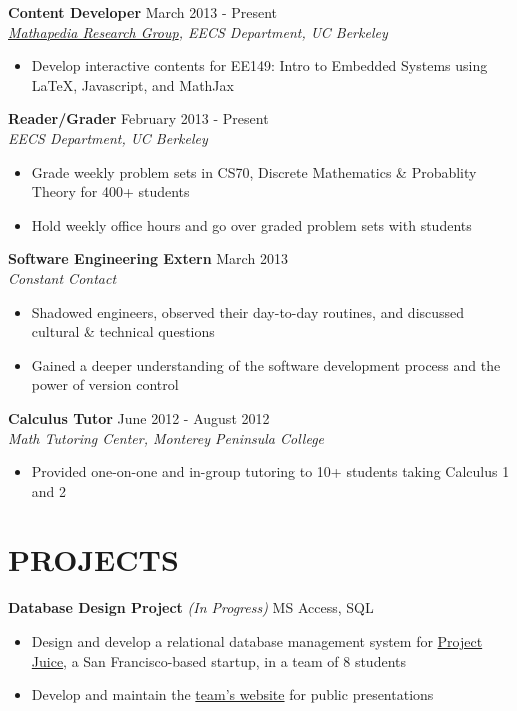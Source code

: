 \documentclass[margin]{res}
\begin{document}
\begin{resume}
\textbf{Content Developer} \hfill March 2013 - Present \\
\textit{\href{https://mathapedia.com/}{Mathapedia Research Group}, EECS Department, UC Berkeley} \smallskip
\begin{itemize}[leftmargin=10pt]
\item Develop interactive contents for EE149: Intro to Embedded Systems using \LaTeX{}, Javascript, and MathJax
\end{itemize}

\textbf{Reader/Grader} \hfill February 2013 - Present\\
\textit{EECS Department, UC Berkeley} \smallskip
\begin{itemize}[leftmargin=10pt]
\item Grade weekly problem sets in CS70, Discrete Mathematics \& Probablity Theory for 400+ students
\item Hold weekly office hours and go over graded problem sets with students
\end{itemize}

\textbf{Software Engineering Extern} \hfill March 2013 \\
\textit{Constant Contact} \smallskip
\begin{itemize}[leftmargin=10pt]
\item Shadowed engineers, observed their day-to-day routines, and discussed cultural \& technical questions
\item Gained a deeper understanding of the software development process and the power of version control  
\end{itemize}

\textbf{Calculus Tutor} \hfill June 2012 - August 2012 \\
\textit{Math Tutoring Center, Monterey Peninsula College} \smallskip
\begin{itemize}[leftmargin=10pt]
\item Provided one-on-one and in-group tutoring to 10+ students taking Calculus 1 and 2
\end{itemize}

\section{PROJECTS} 
\textbf{Database Design Project} \textit{(In Progress)} \hfill MS Access, SQL
\begin{itemize}[leftmargin=10pt]
\itemsep -2pt %
\item Design and develop a relational database management system for \href{http://www.projectjuice.com/}{Project Juice}, a San Francisco-based startup, in a team of 8 students
\item Develop and maintain the \href{http://www.ocf.berkeley.edu/~kqdtran/ieor115/proposal}{team's website} for public presentations
\end{itemize}


\end{resume}
\end{document}
